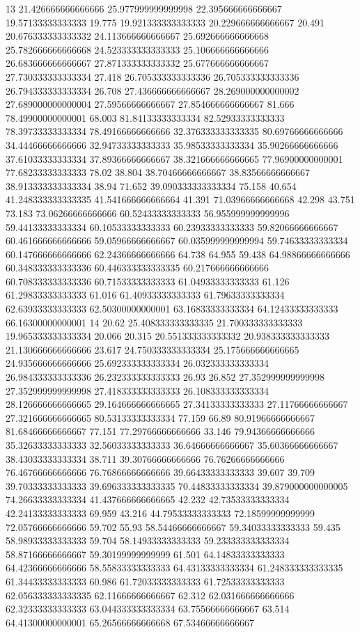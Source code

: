13 21.426666666666666 25.977999999999998 22.395666666666667 19.57133333333333 19.775 19.921333333333333 20.229666666666667 20.491 20.676333333333332 24.113666666666667 25.692666666666668 25.782666666666668 24.523333333333333 25.106666666666666 26.683666666666667 27.871333333333332 25.677666666666667 27.730333333333334 27.418 26.705333333333336 26.705333333333336 26.794333333333334 26.708 27.436666666666667 28.269000000000002 27.689000000000004 27.59566666666667 27.854666666666667 81.666 78.49900000000001 68.003 81.84133333333334 82.52933333333333 78.39733333333334 78.49166666666666 32.376333333333335 80.69766666666666 34.44466666666666 32.94733333333333 35.98533333333334 35.90266666666666 37.61033333333334 37.89366666666667 38.321666666666665 77.96900000000001 77.68233333333333 78.02 38.804 38.70466666666667 38.83566666666667 38.913333333333334 38.94 71.652 39.090333333333334 75.158 40.654 41.248333333333335 41.541666666666664 41.391 71.03966666666668 42.298 43.751 73.183 73.06266666666666 60.52433333333333 56.955999999999996 59.44133333333334 60.10533333333333 60.23933333333333 59.82066666666667 60.461666666666666 59.05966666666667 60.035999999999994 59.74633333333334 60.147666666666666 62.24366666666666 64.738 64.955 59.438 64.98866666666666 60.348333333333336 60.446333333333335 60.217666666666666 60.708333333333336 60.71533333333333 61.04933333333333 61.126 61.29833333333333 61.016 61.40933333333333 61.79633333333334 62.63933333333333 62.50300000000001 63.16833333333334 64.12433333333333 66.16300000000001
14 20.62 25.408333333333335 21.700333333333333 19.965333333333334 20.066 20.315 20.551333333333332 20.938333333333333 21.130666666666666 23.617 24.750333333333334 25.175666666666665 24.935666666666666 25.692333333333334 26.032333333333334 26.984333333333336 26.232333333333333 26.93 26.852 27.352999999999998 27.352999999999998 27.418333333333333 26.108333333333334 28.126666666666665 29.164666666666665 27.34133333333333 27.11766666666667 27.321666666666665 80.53133333333334 77.159 66.89 80.91966666666667 81.68466666666667 77.151 77.29766666666666 33.146 79.94366666666666 35.32633333333333 32.56033333333333 36.64666666666667 35.60366666666667 38.43033333333334 38.711 39.30766666666666 76.76266666666666 76.46766666666666 76.76866666666666 39.66433333333333 39.607 39.709 39.70333333333333 39.696333333333335 70.44833333333334 39.879000000000005 74.26633333333334 41.437666666666665 42.232 42.73533333333334 42.24133333333333 69.959 43.216 44.79533333333333 72.18599999999999 72.05766666666666 59.702 55.93 58.54466666666667 59.34033333333333 59.435 58.98933333333333 59.704 58.14933333333333 59.233333333333334 58.87166666666667 59.30199999999999 61.501 64.14833333333333 64.42366666666666 58.55833333333333 64.43133333333334 61.248333333333335 61.34433333333333 60.986 61.72033333333333 61.72533333333333 62.056333333333335 62.11666666666667 62.312 62.031666666666666 62.32333333333333 63.044333333333334 63.75566666666667 63.514 64.41300000000001 65.26566666666668 67.53466666666667
